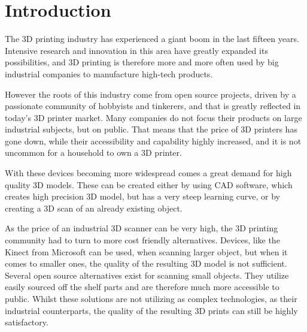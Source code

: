 \chapter{Introduction}
\label{sec:Introduction}
The 3D printing industry has experienced a giant boom in the last fifteen years.
Intensive research and innovation in this area have greatly expanded its possibilities, and 3D printing is therefore more and more often used by big industrial companies to manufacture high-tech products.

However the roots of this industry come from open source projects, driven by a passionate community of hobbyists and tinkerers, and that is greatly reflected in today's 3D printer market.
Many companies do not focus their products on large industrial subjects, but on public. That means that the price of 3D printers has gone down, while their accessibility and capability highly increased, and it is not uncommon for a household to own a 3D printer.

With these devices becoming more widespread comes a great demand for high quality 3D models.
These can be created either by using CAD software, which creates high precision 3D model, but has a very steep learning curve, or by creating a 3D scan of an already existing object.

As the price of an industrial 3D scanner can be very high, the 3D printing community had to turn to more cost friendly alternatives.
Devices, like the Kinect from Microsoft can be used, when scanning larger object, but when it comes to smaller ones, the quality of the resulting 3D model is not sufficient.
Several open source alternatives exist for scanning small objects.
They utilize easily sourced off the shelf parts and are therefore much more accessible to public.
Whilst these solutions are not utilizing as complex technologies, as their industrial counterparts, the quality of the resulting 3D prints can still be highly satisfactory.



\endinput